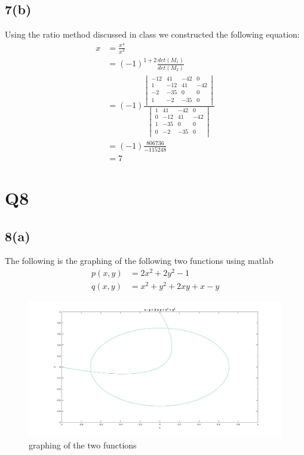 \documentclass{article}
\begin{document}
\subsection{7(b)}
Using the ratio method discussed in class we constructed the following equation:
\begin{equation*}
\begin{aligned}
x &= \frac{x^4}{x^3} \\
&=(-1)^{1+2}\frac{det(M_1)}{det(M_2)} \\
&=(-1)\frac{
	\begin{vmatrix}
	-12 & 41 &-42 &  0\\
	  1 &-12 & 41 &-42\\
	 -2 &-35 &  0 &  0\\
	  1 & -2 &-35 &  0\\
	\end{vmatrix}
}{
	\begin{vmatrix}
	  1 & 41 &-42 &  0\\
	  0 &-12 & 41 &-42\\
	  1 &-35 &  0 &  0\\
	  0 & -2 &-35 &  0\\	
	\end{vmatrix}
}\\
&=(-1)\frac{806736}{-115248}\\
&=7
\end{aligned}
\end{equation*}
\section{Q8}
\subsection{8(a)}
The following is the graphing of the following two functions using matlab
\begin{equation*}
\begin{aligned}
p(x,y) &= 2x^2 +2y^2 -1\\
q(x,y) &= x^2 + y^2 + 2xy + x - y
\end{aligned}
\end{equation*}
\begin{figure}[H]
\centering
\includegraphics[width=5in]{p8-1.jpg}
\caption{graphing of the two functions}
\end{figure}
\end{document}
